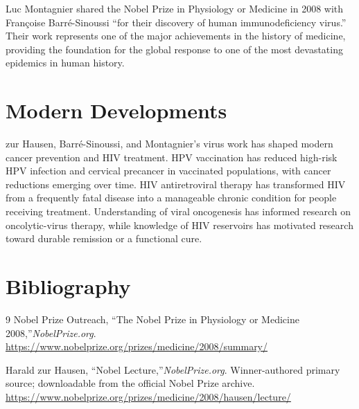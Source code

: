 Luc Montagnier shared the Nobel Prize in Physiology or Medicine in 2008 with Fran\c{c}oise Barr\'e-Sinoussi ``for their discovery of human immunodeficiency virus.'' Their work represents one of the major achievements in the history of medicine, providing the foundation for the global response to one of the most devastating epidemics in human history.


\section{Modern Developments}

zur Hausen, Barr\'e-Sinoussi, and Montagnier's virus work has shaped modern cancer prevention and HIV treatment. HPV vaccination has reduced high-risk HPV infection and cervical precancer in vaccinated populations, with cancer reductions emerging over time. HIV antiretroviral therapy has transformed HIV from a frequently fatal disease into a manageable chronic condition for people receiving treatment. Understanding of viral oncogenesis has informed research on oncolytic-virus therapy, while knowledge of HIV reservoirs has motivated research toward durable remission or a functional cure.


\section{Bibliography}

\begin{thebibliography}{9}
Nobel Prize Outreach, ``The Nobel Prize in Physiology or Medicine 2008,''\emph{NobelPrize.org}.\\
\url{https://www.nobelprize.org/prizes/medicine/2008/summary/}

Harald zur Hausen, ``Nobel Lecture,''\emph{NobelPrize.org}. Winner-authored primary source; downloadable from the official Nobel Prize archive.\\
\url{https://www.nobelprize.org/prizes/medicine/2008/hausen/lecture/}
\end{thebibliography}

